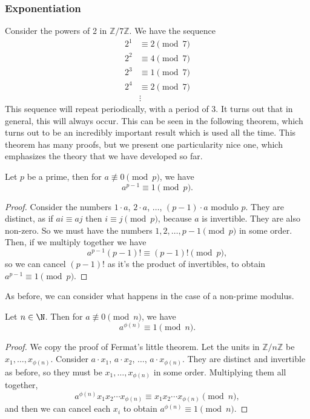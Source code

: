 \documentclass[a4paper]{scrartcl}
\begin{document}
\subsubsection{Exponentiation}

Consider the powers of 2 in $\mathbb{Z}/7\mathbb{Z}$. We have the sequence
\begin{align*}
	2^1 &\equiv 2 \pmod{7}\\
	2^2 &\equiv 4 \pmod{7}\\
	2^3 &\equiv 1 \pmod{7}\\
	2^4 &\equiv 2 \pmod{7}\\
		&\vdots
\end{align*}
This sequence will repeat periodically, with a period of 3.
It turns out that in general, this will always occur. This can be seen in the following theorem, which turns out to be an incredibly important result which is used all the time. This theorem has many proofs, but we present one particularity nice one, which emphasizes the theory that we have developed so far.

\begin{theorem}
	Let $p$ be a prime, then for $a \not\equiv 0 \pmod{p}$, we have 
	$$a^{p - 1} \equiv 1 \pmod{p}.$$
\end{theorem}
\begin{proof}
	Consider the numbers $1 \cdot a$, $2 \cdot a$, $\dots$, $(p - 1) \cdot a$ modulo $p$. They are distinct, as if $a i \equiv aj$ then $i \equiv j \pmod{p}$, because $a$ is invertible. They are also non-zero. So we must have the numbers $1, 2, \dots, p - 1 \pmod{p}$ in some order. Then, if we multiply together we have
	$$
	a^{p - 1} (p - 1)! \equiv (p - 1)! \pmod{p},
	$$
	so we can cancel $(p - 1)!$ as it's the product of invertibles, to obtain $a^{p - 1} \equiv 1 \pmod{p}$.
\end{proof}

As before, we can consider what happens in the case of a non-prime modulus.

\begin{theorem}
	Let $n \in \N$. Then for $a \not \equiv 0 \pmod{n}$, we have
	$$
	a^{\phi(n)} \equiv 1 \pmod{n}.
	$$
\end{theorem}
\begin{proof}
	We copy the proof of Fermat's little theorem. Let the units in $\mathbb{Z}/n\mathbb{Z}$ be $x_1, \dots, x_{\phi(n)}$. Consider $a \cdot x_1$, $a \cdot x_2$, $\dots$, $a \cdot x_{\phi(n)}$. They are distinct and invertible as before, so they must be $x_1, \dots, x_{\phi(n)}$ in some order. Multiplying them all together,
	$$
	a^{\phi(n)} x_1 x_2 \cdots x_{\phi(n)} \equiv x_1 x_2 \cdots x_{\phi(n)} \pmod{n},
	$$
	and then we can cancel each $x_i$ to obtain $a^{\phi(n)} \equiv 1 \pmod{n}$.
\end{proof}
\end{document}
